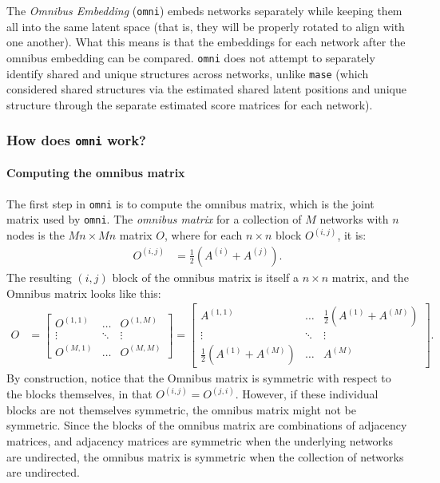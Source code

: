 The \textit{Omnibus Embedding} (\texttt{omni}) embeds networks separately while keeping them all into the same latent space (that is, they will be properly rotated to align with one another). What this means is that the embeddings for each network after the omnibus embedding can be compared. \texttt{omni} does not attempt to separately identify shared and unique structures across networks, unlike \texttt{mase} (which considered shared structures via the estimated shared latent positions and unique structure through the separate estimated score matrices for each network).

\subsubsection{How does \texttt{omni} work?}

\paragraph*{Computing the omnibus matrix}

The first step in \texttt{omni} is to compute the omnibus matrix, which is the joint matrix used by \texttt{omni}. The \textit{omnibus matrix} for a collection of $M$ networks with $n$ nodes is the $Mn \times Mn$ matrix $O$, where for each $n \times n$ block $O^{(i, j)}$, it is:
\begin{align*}
    O^{(i, j)} &= \frac{1}{2}\left(A^{(i)} + A^{(j)}\right).
\end{align*}
The resulting $(i, j)$ block of the omnibus matrix is itself a $n \times n$ matrix, and the Omnibus matrix looks like this:
\begin{align*}
    O &= \begin{bmatrix}
        O^{(1, 1)} & \hdots & O^{(1, M)} \\
        \vdots & \ddots & \vdots \\
        O^{(M, 1)} & \hdots & O^{(M, M)}
    \end{bmatrix} = \begin{bmatrix}
        A^{(1, 1)} & \hdots & \frac{1}{2}\left(A^{(1)} + A^{(M)}\right) \\
        \vdots & \ddots & \vdots \\
        \frac{1}{2}\left(A^{(1)} + A^{(M)}\right) & \hdots &  A^{(M)}
    \end{bmatrix}.
\end{align*}
By construction, notice that the Omnibus matrix is symmetric with respect to the blocks themselves, in that $O^{(i, j)} = O^{(j, i)}$. However, if these individual blocks are not themselves symmetric, the omnibus matrix might not be symmetric. Since the blocks of the omnibus matrix are combinations of adjacency matrices, and adjacency matrices are symmetric when the underlying networks are undirected, the omnibus matrix is symmetric when the collection of networks are undirected. 

